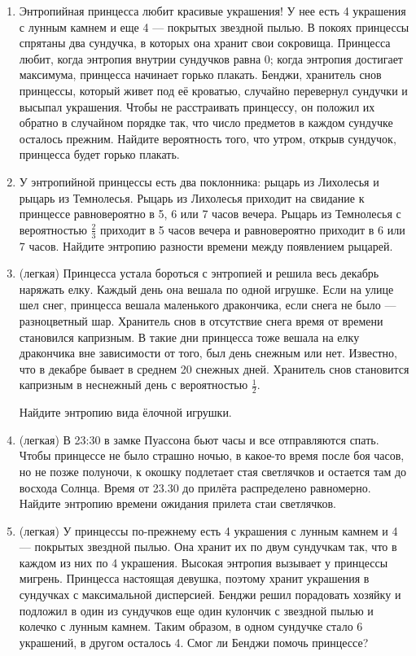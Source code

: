 \documentclass[a4paper,12pt]{article}
\begin{document}
\begin{enumerate} %
\item  %
Энтропийная принцесса любит красивые украшения! У нее есть 4 украшения с лунным камнем и еще 4 — покрытых звездной пылью.
В покоях принцессы спрятаны два сундучка, в которых она хранит свои сокровища.
Принцесса любит, когда энтропия внутрии сундучков равна 0;
когда энтропия достигает максимума, принцесса начинает горько плакать.
Бенджи, хранитель снов принцессы, который живет под её кроватью, случайно перевернул сундучки и высыпал украшения. Чтобы не расстраивать принцессу, он положил их обратно в случайном порядке так, что число предметов в каждом сундучке осталось прежним. Найдите вероятность того, что утром, открыв сундучок, принцесса будет горько плакать.
\item
У энтропийной принцессы есть два поклонника: рыцарь из Лихолесья и  рыцарь из Темнолесья. Рыцарь из Лихолесья приходит на свидание к принцессе равновероятно в 5, 6 или 7 часов вечера. Рыцарь из Темнолесья с вероятностью $\frac{2}{3}$ приходит в 5 часов вечера и равновероятно приходит в 6 или 7 часов. Найдите энтропию разности времени между появлением рыцарей.

\item (легкая)
Принцесса устала бороться с энтропией и решила весь декабрь наряжать елку.
Каждый день она вешала по одной игрушке.
Если на улице шел снег, принцесса вешала маленького дракончика, если снега не было — разноцветный шар.
Хранитель снов в отсутствие снега время от времени становился капризным.
В такие дни принцесса тоже вешала на елку дракончика вне зависимости от того, был день снежным или нет.
Известно, что в декабре бывает в среднем 20 снежных дней.
Хранитель снов становится капризным в неснежный день с вероятностью $\frac{1}{2}$.

Найдите энтропию вида ёлочной игрушки.
\item (легкая)
В 23:30 в замке Пуассона бьют часы и все отправляются спать.
Чтобы принцессе не было страшно ночью, в какое-то время после боя часов, но не позже полуночи,
к окошку подлетает стая светлячков и остается там до восхода Солнца. Время от 23.30 до прилёта распределено равномерно.
Найдите энтропию времени ожидания прилета стаи светлячков.

\item (легкая)
У принцессы по-прежнему есть  4 украшения с лунным камнем и 4 — покрытых звездной пылью. 
Она хранит их по двум сундучкам так, что в каждом из них по 4 украшения. 
Высокая энтропия вызывает у принцессы мигрень. Принцесса настоящая девушка, поэтому хранит украшения в сундучках с максимальной дисперсией. Бенджи решил порадовать хозяйку и подложил в один из сундучков еще один кулончик с звездной пылью и колечко с лунным камнем. Таким образом, в одном сундучке стало 6 украшений, в другом осталось 4. Смог ли Бенджи помочь принцессе?
\end{enumerate}
\end{document}
